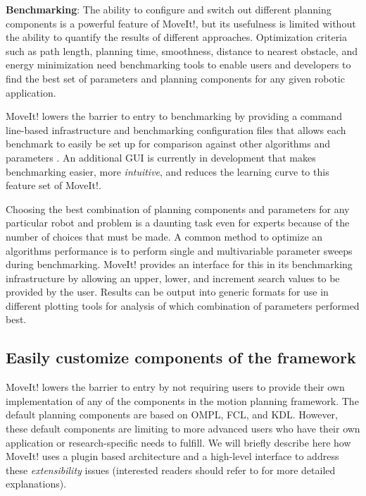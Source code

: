 \documentclass[10pt,journal,compsoc]{joser1}
\begin{document}
{{\bf Benchmarking}: The ability to configure and switch out different planning components is a powerful feature of MoveIt!, but its usefulness is limited without the ability to quantify the results of different approaches. Optimization criteria such as path length, planning time, smoothness, distance to nearest obstacle, and energy minimization need benchmarking tools to enable users and developers to find the best set of parameters and planning components for any given robotic application.

MoveIt! lowers the barrier to entry to benchmarking by providing a command line-based infrastructure and benchmarking configuration files that allows each benchmark to easily be set up for comparison against other algorithms and parameters \cite{cohen2012generic}. An additional GUI is currently in development that makes benchmarking easier, more \textit{intuitive}, and reduces the learning curve to this feature set of MoveIt!.

Choosing the best combination of planning components and parameters for any particular robot and problem is a daunting task even for experts because of the number of choices that must be made\cite{cohen2012generic}. A common method to optimize an algorithms performance is to perform single and multivariable parameter sweeps during benchmarking. MoveIt! provides an interface for this in its benchmarking infrastructure by allowing an upper, lower, and increment search values to be provided by the user. Results can be output into generic formats for use in different plotting tools for analysis of which combination of parameters performed best.

\subsection{Easily customize components of the framework}
\label{subsec:extensiblity}

MoveIt! lowers the barrier to entry by not requiring users to provide their own implementation of any of the components in the motion planning framework. The default planning components are based on OMPL, FCL, and KDL. However, these default components are limiting to more advanced users who have their own application or research-specific needs to fulfill. We will briefly describe here how MoveIt! uses a plugin based architecture and a high-level interface to address these \textit{extensibility} issues (interested readers should refer to \cite{moveit} for more detailed explanations). 

}
\end{document}
